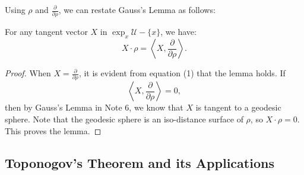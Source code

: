 \documentclass{ctexart}
\begin{document}
Using $\rho$ and $\frac{\partial}{\partial \rho}$, we can restate Gauss's Lemma as follows:
\begin{lemma}
  For any tangent vector $X$ in $\exp _x \mathcal{U}-\{x\}$, we have:
  $$
  X \cdot \rho=\left\langle X, \frac{\partial}{\partial \rho}\right\rangle.
  $$  
\end{lemma}
\begin{proof}[Proof]
  When $X=\frac{\partial}{\partial \rho}$, it is evident from equation (1) that the lemma holds. If
  $$
  \left\langle X, \frac{\partial}{\partial \rho}\right\rangle=0,
  $$
  then by Gauss's Lemma in Note 6, we know that $X$ is tangent to a geodesic sphere. Note that the geodesic sphere is an iso-distance surface of $\rho$, so $X \cdot \rho=0$. This proves the lemma.  
\end{proof}

\subsection*{Toponogov's Theorem and its Applications}
\end{document}
